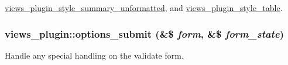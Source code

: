\hyperlink{classviews__plugin__style__summary__unformatted_a8770285dac047bf88a2c77b2e798826d}{views\_\-plugin\_\-style\_\-summary\_\-unformatted}, and \hyperlink{classviews__plugin__style__table_a732752fb9b74bdb48673cb9ff4150be9}{views\_\-plugin\_\-style\_\-table}.\hypertarget{classviews__plugin_a442b0f392deb52725ec8159e05654e06}{
\subsubsection[{options\_\-submit}]{\setlength{\rightskip}{0pt plus 5cm}views\_\-plugin::options\_\-submit (\&\$ {\em form}, \/  \&\$ {\em form\_\-state})}}
\label{classviews__plugin_a442b0f392deb52725ec8159e05654e06}
Handle any special handling on the validate form. 

